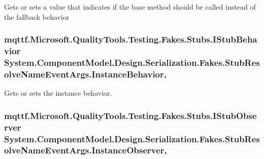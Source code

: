 Gets or sets a value that indicates if the base method should be called instead of the fallback behavior

\hypertarget{class_system_1_1_component_model_1_1_design_1_1_serialization_1_1_fakes_1_1_stub_resolve_name_event_args_a96335de86dcac049bd7fca8470d7021b}{
\subsubsection[{Instance\-Behavior}]{\setlength{\rightskip}{0pt plus 5cm}mqttf.\-Microsoft.\-Quality\-Tools.\-Testing.\-Fakes.\-Stubs.\-I\-Stub\-Behavior System.\-Component\-Model.\-Design.\-Serialization.\-Fakes.\-Stub\-Resolve\-Name\-Event\-Args.\-Instance\-Behavior\hspace{0.3cm}{\ttfamily [get]}, {\ttfamily [set]}}}\label{class_system_1_1_component_model_1_1_design_1_1_serialization_1_1_fakes_1_1_stub_resolve_name_event_args_a96335de86dcac049bd7fca8470d7021b}


Gets or sets the instance behavior.

\hypertarget{class_system_1_1_component_model_1_1_design_1_1_serialization_1_1_fakes_1_1_stub_resolve_name_event_args_a69fc4f0e5d8dfc9659f7faa8c5482690}{
\subsubsection[{Instance\-Observer}]{\setlength{\rightskip}{0pt plus 5cm}mqttf.\-Microsoft.\-Quality\-Tools.\-Testing.\-Fakes.\-Stubs.\-I\-Stub\-Observer System.\-Component\-Model.\-Design.\-Serialization.\-Fakes.\-Stub\-Resolve\-Name\-Event\-Args.\-Instance\-Observer\hspace{0.3cm}{\ttfamily [get]}, {\ttfamily [set]}}}\label{class_system_1_1_component_model_1_1_design_1_1_serialization_1_1_fakes_1_1_stub_resolve_name_event_args_a69fc4f0e5d8dfc9659f7faa8c5482690}


